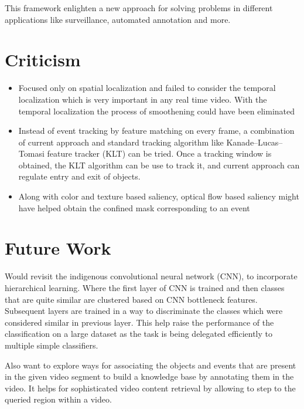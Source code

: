 \par This framework enlighten a new approach for solving problems in different applications like surveillance, automated annotation and more.

\section{Criticism}
\begin{itemize}
	\item{Focused only on spatial localization and failed to consider the temporal localization which is very important in any real time video.  With the temporal localization the process of smoothening could have been eliminated}
	\item{Instead of event tracking by feature matching on every frame, a combination of current approach and standard tracking algorithm like Kanade–Lucas–Tomasi feature tracker (KLT) can be tried.  Once a tracking window is obtained, the KLT algorithm can be use to track it, and current approach can regulate entry and exit of objects.}
	\item{Along with color and texture based saliency, optical flow based saliency might have helped obtain the confined mask corresponding to an event}
\end{itemize}
\clearpage 
\section{Future Work}
Would revisit the indigenous convolutional neural network (CNN), to incorporate hierarchical learning.  Where the first layer of CNN is trained and then classes that are quite similar are clustered based on CNN bottleneck features.  Subsequent layers are trained in a way to discriminate the classes which were considered similar in previous layer.  This help raise the performance of the classification on a large dataset as the task is being delegated efficiently to multiple simple classifiers.
\par Also want to explore ways for associating the objects and events that are present in the given video segment to build a knowledge base by annotating them in the video.  It helps for sophisticated video content retrieval by allowing to step to the queried region within a video.